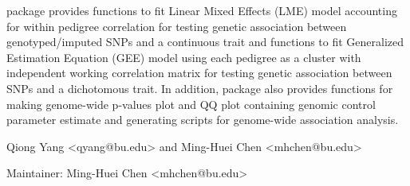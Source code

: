 \begin{Description}\relax
{} package provides functions to fit Linear Mixed Effects (LME) model accounting for within pedigree correlation 
for testing genetic association between genotyped/imputed SNPs and a continuous trait and functions to 
fit Generalized Estimation Equation (GEE) model using each pedigree as a cluster with independent working correlation matrix
for testing genetic association between SNPs and a dichotomous trait. In addition,  package 
also provides functions for making genome-wide p-values plot and QQ plot containing genomic control 
parameter estimate and generating scripts for genome-wide association analysis.
\end{Description}
\begin{Details}\relax
{}
\end{Details}
\begin{Author}\relax
Qiong Yang <qyang@bu.edu> and Ming-Huei Chen <mhchen@bu.edu>

Maintainer: Ming-Huei Chen <mhchen@bu.edu>
\end{Author}

